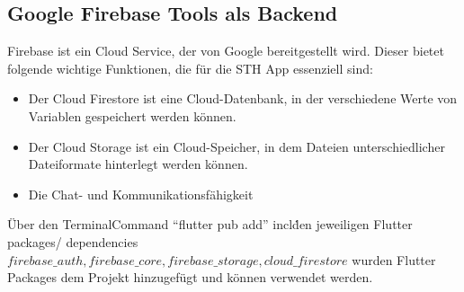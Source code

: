 \subsection{Google Firebase Tools als Backend}
Firebase ist ein Cloud Service, der von Google bereitgestellt wird.
Dieser bietet folgende wichtige Funktionen, die für die STH App essenziell sind:
\begin{itemize}
    \item Der Cloud Firestore ist eine Cloud-Datenbank, in der verschiedene Werte von Variablen gespeichert werden können.
    \item Der Cloud Storage ist ein Cloud-Speicher, in dem Dateien unterschiedlicher Dateiformate hinterlegt werden können.
    \item Die Chat- und Kommunikationsfähigkeit
\end{itemize}
Über den Terminal\-Command ``flutter pub add'' incl\. den jeweiligen Flutter packages/ dependencies \(firebase\_auth, firebase\_core, firebase\_storage, cloud\_firestore\) wurden Flutter Packages dem Projekt hinzugefügt und können verwendet werden.

